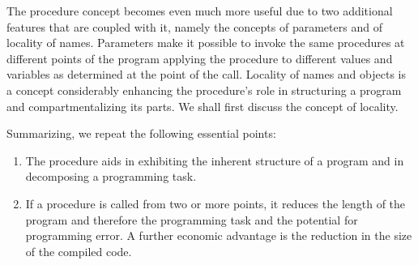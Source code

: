 The procedure concept becomes even much more useful due to two additional features that are
coupled with it, namely the concepts of parameters and of locality of names. Parameters make it
possible to invoke the same procedures at different points of the program applying the procedure to
different values and variables as determined at the point of the call. Locality of names and objects
is a concept considerably enhancing the procedure's role in structuring a program and
compartmentalizing its parts. We shall first discuss the concept of locality.

Summarizing, we repeat the following essential points:
\begin{enumerate}
  \item The procedure aids in exhibiting the inherent structure of a program and in decomposing
    a programming task.
  \item If a procedure is called from two or more points, it reduces the length of the program
    and therefore the programming task and the potential for programming error. A further
    economic advantage is the reduction in the size of the compiled code.
\end{enumerate}
